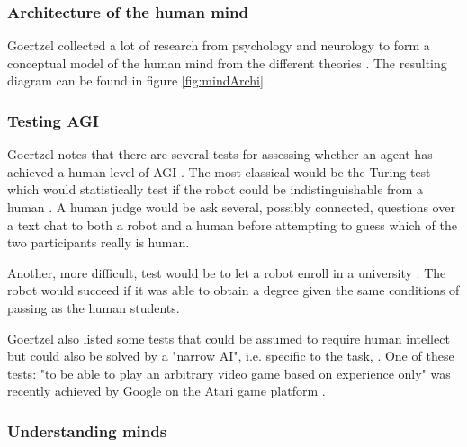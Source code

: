 \documentclass[11pt]{article}
\newenvironment{sketch}{\color{dark-green-2}}{\ignorespacesafterend}
\newenvironment{draft}{\color{dark-cornflower-blue-2}}{\ignorespacesafterend}
\begin{document}
\begin{draft}
\subsubsection*{Architecture of the human mind}
Goertzel collected a lot of research from psychology and neurology to form a conceptual model of the human mind from the different theories \cite{goertzel2012agi}. The resulting diagram can be found in figure \ref{fig:mindArchi}.

\end{draft}



\subsubsection*{Testing AGI}
\begin{draft}
Goertzel notes that there are several tests for assessing whether an agent has achieved a human level of AGI \cite{goertzel2012agi}. The most classical would be the Turing test which would statistically test if the robot could be indistinguishable from a human \cite{turing1950computing}. A human judge would be ask several, possibly connected, questions over a text chat to both a robot and a human before attempting to guess which of the two participants really is human.

Another, more difficult, test would be to let a robot enroll in a university \cite{goertzel2012agi}. The robot would succeed if it was able to obtain a degree given the same conditions of passing as the human students.

Goertzel also listed some tests that could be assumed to require human intellect but could also be solved by a "narrow AI", i.e. specific to the task, \cite{goertzel2012agi}. One of these tests: "to be able to play an arbitrary video game based on experience only" was recently achieved by Google on the Atari game platform \cite{googleAtari}.
\end{draft}

\subsubsection*{Understanding minds}
\end{document}
